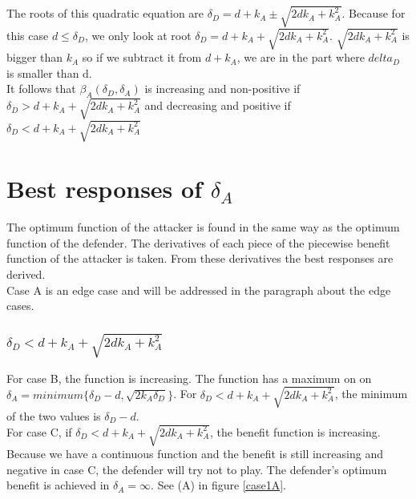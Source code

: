 The roots of this quadratic equation are $\delta_{D}=d+k_{A}\pm \sqrt{2dk_{A}+k_{A}^{2}}$. Because for this case $d\leq \delta_{D}$, we only look at root $\delta_{D}=d+k_{A} + \sqrt{2dk_{A}+k_{A}^{2}}$. $\sqrt{2dk_{A}+k_{A}^{2}}$ is bigger than $k_{A}$ so if we subtract it from $d+k_{A}$, we are in the part where $delta_{D}$ is smaller than d. \\
It follows that $\beta_{A}(\delta_{D},\delta_{A})$ is increasing and non-positive if $\delta_{D}> d+k_{A} + \sqrt{2dk_{A}+k_{A}^{2}}$ and decreasing and positive if $\delta_{D} < d+k_{A} + \sqrt{2dk_{A}+k_{A}^{2}}$  \\

\section{Best responses of $\delta_{A}$}
The optimum function of the attacker is found in the same way as the optimum function of the defender. The derivatives of each piece of the piecewise benefit function of the attacker is taken. From these derivatives the best responses are derived. \\
Case A is an edge case and will be addressed in the paragraph about the edge cases.
%
%

\subsubsection*{$\delta_{D} < d+k_{A} + \sqrt{2dk_{A}+k_{A}^{2}}$} 
For case B, the function is increasing. The function has a maximum on on $\delta_{A} = minimum \{\delta_{D} -d, \sqrt{2k_{A}\delta_{D}} \} $. For $\delta_{D} < d+k_{A} + \sqrt{2dk_{A}+k_{A}^{2}}$, the minimum of the two values is $\delta_{D}-d$.\\
For case C, if $\delta_{D} < d+k_{A} + \sqrt{2dk_{A}+k_{A}^{2}}$, the benefit function is increasing. Because we have a continuous function and the benefit is still increasing and negative in case C, the defender will try not to play. The defender's optimum benefit is achieved in $\delta_{A}=\infty$. See (A) in figure \ref{case1A}.

